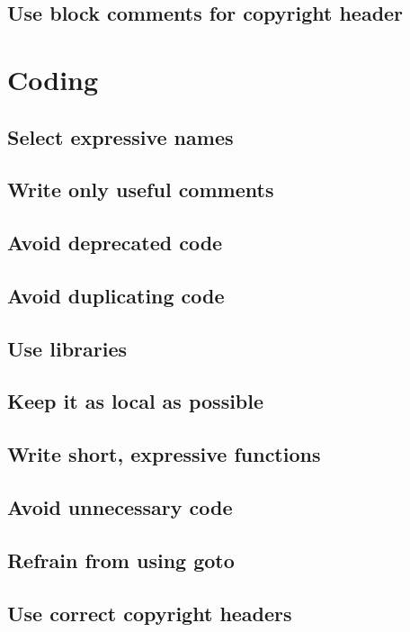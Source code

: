 \documentclass[a4paper,11pt]{scrreprt}
\begin{document}
\section{Use block comments for copyright header}


\chapter{Coding}
\section{Select expressive names}
\section{Write only useful comments}
\section{Avoid deprecated code}
\section{Avoid duplicating code}
\section{Use libraries}
\section{Keep it as local as possible}
\section{Write short, expressive functions}
\section{Avoid unnecessary code}
\section{Refrain from using goto}
\section{Use correct copyright headers}
\end{document}
